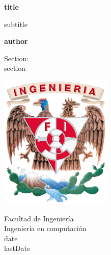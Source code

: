 \begin{titlepage}
	\begin{center}
		\vspace*{1cm}
		
		\textbf{\acrlong{title}}
		
		\vspace{0.5cm}
		\acrlong{subtitle}
		
		\vspace{1.5cm}
		
		\textbf{\acrfull{author}}
		
		\vfill
		
		Section: \\
		\acrlong{section}
		
		\vspace{0.8cm}
		
		\includegraphics[width=0.4\textwidth]{logo}
		
		Facultad de Ingenier\'{i}a\\
		Ingenier\'{i}a en computaci\'{o}n\\
		\acrlong{date}\\
		\acrlong{lastDate}
		
	\end{center}
\end{titlepage}
\newpage